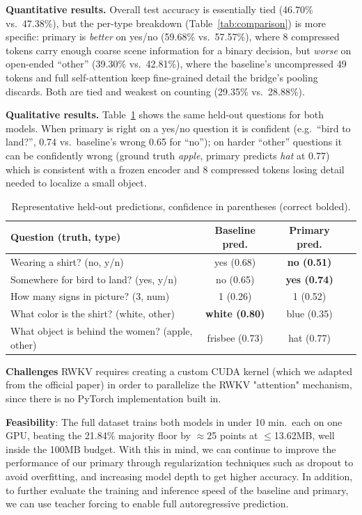 \documentclass[final]{article}
\begin{document}
\textbf{Quantitative results.} Overall test accuracy is essentially tied (46.70\% vs.\ 47.38\%),
but the per-type breakdown (Table~\ref{tab:comparison}) is more specific: primary is
\emph{better} on yes/no (59.68\% vs.\ 57.57\%), where 8 compressed tokens carry enough coarse
scene information for a binary decision, but \emph{worse} on open-ended ``other'' (39.30\% vs.\
42.81\%), where the baseline's uncompressed 49 tokens and full self-attention keep fine-grained
detail the bridge's pooling discards. Both are tied and weakest on counting (29.35\% vs.\
28.88\%).

\textbf{Qualitative results.} Table~\ref{tab:qualitative} shows the same held-out questions for
both models. When primary is right on a yes/no question it is confident (e.g.\ ``bird to land?'',
0.74 vs.\ baseline's wrong 0.65 for ``no''); on harder ``other'' questions it can be confidently
wrong (ground truth \emph{apple}, primary predicts \emph{hat} at 0.77) which is consistent with a
frozen encoder and 8 compressed tokens losing detail needed to localize a small object.

\begin{table}[!htbp]
\centering
\footnotesize

\small
\begin{tabular}{lccc}
\toprule
Question (truth, type) & Baseline pred. & Primary pred. \\
\midrule
Wearing a shirt? (no, y/n) & yes (0.68) & \textbf{no (0.51)} \\
Somewhere for bird to land? (yes, y/n) & no (0.65) & \textbf{yes (0.74)} \\
How many signs in picture? (3, num) & 1 (0.26) & 1 (0.52) \\
What color is the shirt? (white, other) & \textbf{white (0.80)} & blue (0.35) \\
What object is behind the women? (apple, other) & frisbee (0.73) & hat (0.77) \\
\bottomrule
\end{tabular}%

\caption{Representative held-out predictions, confidence in parentheses (correct bolded).}
\label{tab:qualitative}
\end{table}

\textbf{Challenges} RWKV requires creating a custom CUDA kernel (which we adapted from the official paper) in order to parallelize the RWKV "attention" mechanism, since there is no PyTorch implementation built in.

\textbf{Feasibility}: The full dataset trains both models in under
10 min.\ each on one GPU, beating the 21.84\% majority floor by $\approx$25 points at
$\le$13.62MB, well inside the 100MB budget. With this in mind, we can continue to improve the performance of our primary through regularization techniques such as dropout to avoid overfitting, and increasing model depth to get higher accuracy. In addition, to further evaluate the training and inference speed of the baseline and primary, we can use teacher forcing to enable full autoregressive prediction. 

\newpage


\end{document}
